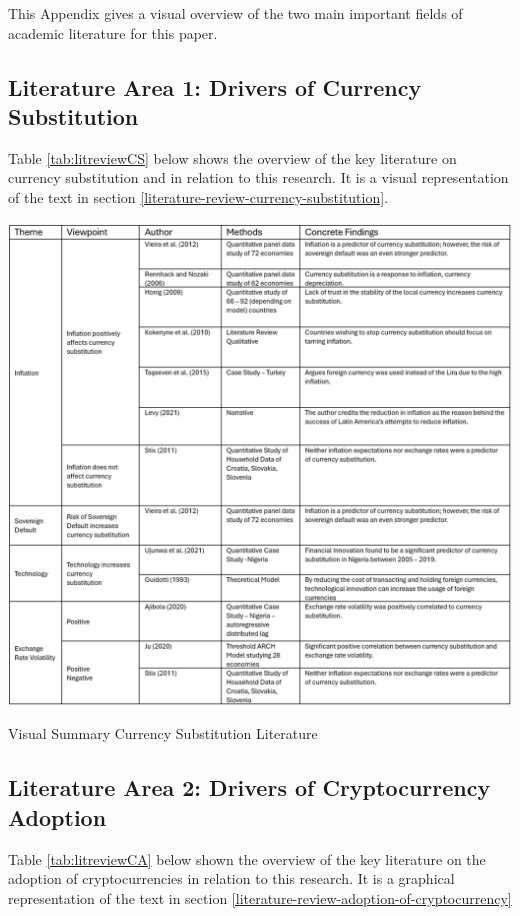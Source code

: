 \documentclass[
]{article}
\begin{document}
This Appendix gives a visual overview of the two main important fields of academic literature for this paper.

\subsection{Literature Area 1: Drivers of Currency Substitution}\label{literature-area-1-drivers-of-currency-substitution}

Table \ref{tab:litreviewCS} below shows the overview of the key literature on currency substitution and in relation to this research. It is a visual representation of the text in section \ref{literature-review-currency-substitution}.

\FloatBarrier

\begin{table}[ht]
\centering
\includegraphics[width=0.9\linewidth]{review_CS.png}
\caption{Visual Summary Currency Substitution Literature}
\label{tab:litreviewCS}
\end{table}

\FloatBarrier

\newpage

\subsection{Literature Area 2: Drivers of Cryptocurrency Adoption}\label{literature-area-2-drivers-of-cryptocurrency-adoption}

Table \ref{tab:litreviewCA} below shown the overview of the key literature on the adoption of cryptocurrencies in relation to this research. It is a graphical representation of the text in section \ref{literature-review-adoption-of-cryptocurrency}
\end{document}
